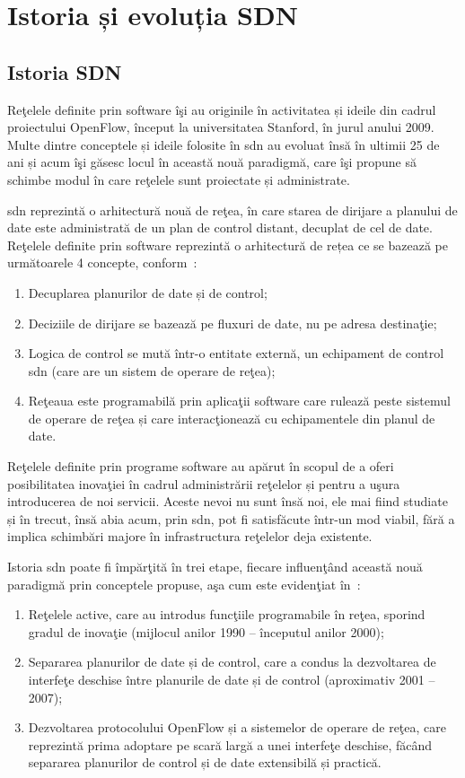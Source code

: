 \section{Istoria și evoluția SDN}

\subsection{Istoria SDN}

Reţelele definite prin software îşi au originile în activitatea și ideile din cadrul proiectului OpenFlow, început la universitatea Stanford, în jurul anului 2009. Multe dintre conceptele și ideile folosite în \gls{sdn} au evoluat însă în ultimii 25 de ani și acum îşi găsesc locul în această nouă paradigmă, care îşi propune să schimbe modul în care reţelele sunt proiectate și administrate.

\gls{sdn} reprezintă o arhitectură nouă de reţea, în care starea de dirijare a planului de date este administrată de un plan de control distant, decuplat de cel de date. Reţelele definite prin software reprezintă o arhitectură de rețea ce se bazează pe următoarele 4 concepte, conform~\cite{kreutz2015software}:
\begin{enumerate}
	\item Decuplarea planurilor de date și de control;
	\item Deciziile de dirijare se bazează pe fluxuri de date, nu pe adresa destinaţie;
	\item Logica de control se mută într-o entitate externă, un echipament de control \gls{sdn} (care are un sistem de operare de reţea);
	\item Reţeaua este programabilă prin aplicaţii software care rulează peste sistemul de operare de reţea și care interacţionează cu echipamentele din planul de date.
\end{enumerate}

Reţelele definite prin programe software au apărut în scopul de a oferi posibilitatea inovaţiei în cadrul administrării reţelelor și pentru a uşura introducerea de noi servicii. Aceste nevoi nu sunt însă noi, ele mai fiind studiate și în trecut, însă abia acum, prin \gls{sdn}, pot fi satisfăcute într-un mod viabil, fără a implica schimbări majore în infrastructura reţelelor deja existente.

Istoria \gls{sdn} poate fi împărţită în trei etape, fiecare influenţând această nouă paradigmă prin conceptele propuse, aşa cum este evidenţiat în~\cite{feamster2014road}:
\begin{enumerate}
	\item Reţelele active, care au introdus funcţiile programabile în reţea, sporind gradul de inovaţie (mijlocul anilor 1990 – începutul anilor 2000);
	\item Separarea planurilor de date și de control, care a condus la dezvoltarea de interfeţe deschise între planurile de date și de control (aproximativ 2001 – 2007);
	\item Dezvoltarea protocolului OpenFlow și a sistemelor de operare de reţea, care reprezintă prima adoptare pe scară largă a unei interfeţe deschise, făcând separarea planurilor de control și de date extensibilă și practică.
\end{enumerate}

